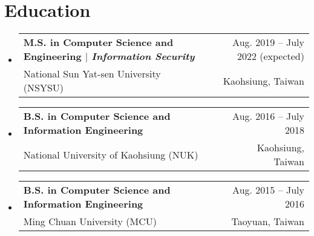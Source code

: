 \documentclass[A4,11pt]{article}
\makeatletter
\newcommand{\CVSubheading}[4]{
  \vspace{-2pt}\item
    \begin{tabular*}{0.97\textwidth}[t]{l@{\extracolsep{\fill}}r}
      \textbf{#1} & #2 \\
      \small#3 & \small #4 \\
    \end{tabular*}\vspace{-7pt}
}
\newcommand{\CVSubHeadingListStart}{\begin{itemize}[leftmargin=0.5cm, label={}]}
\newcommand{\CVSubHeadingListEnd}{\end{itemize}}
\makeatother
\begin{document}
\begin{comment}
This CV was written for specifically for positions I was applying for in
academia, and then modified to be a template.

A standard CV is about two pages long where as a resume in the US is one page.
sections can be added and removed here with this in mind. In my experience, 
education, and applicable work experience and skills are the most import things
to include on a resume. For a CV the Europass CV suggests the categories: Work
Experience, Education and Training, Language Skills, Digital Skills,
Communication and Interpersonal Skills, Conferences and Seminars, Creative Works
Driver's License, Hobbies and Interests, Honors and Awards, Management and
Leadership Skills, Networks and Memberships, Organizational Skills, Projects,
Publications, Recommendations, Social and Political Activities, Volunteering.

Your goal is to convey a who, what , when, where, why for every item you share. 
The who is obviously you, but I believe the rest should be done in that order.
For example below. An employer cares most about the degree held and typically 
less about the institution or where it is located (This is still good 
information though). Whatever order you choose be consistent throughout.
\end{comment}

\section{Education}
  \CVSubHeadingListStart
    \CVSubheading
      {M.S. in Computer Science and Engineering $|$ \emph{\small{Information Security}}}{Aug. 2019 -- July 2022 (expected)}
      {National Sun Yat-sen University (NSYSU)}{Kaohsiung, Taiwan}
    \CVSubheading
      {B.S. in Computer Science and Information Engineering}{Aug. 2016 -- July 2018}
      {National University of Kaohsiung (NUK)}{Kaohsiung, Taiwan}
    \CVSubheading
      {B.S. in Computer Science and Information Engineering}{Aug. 2015 -- July 2016}
      {Ming Chuan University (MCU)}{Taoyuan, Taiwan}
  \CVSubHeadingListEnd

\begin{comment}
  try to briefly explain what you did and why it is relevant to the position you
  are seeking
  \end{comment}
  
\end{document}
